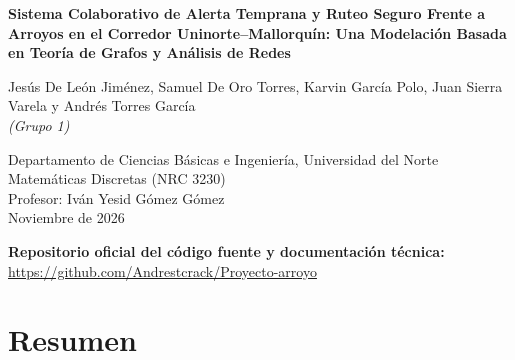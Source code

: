 \documentclass[12pt,letterpaper]{article}
\begin{document}
\begin{titlepage}
    \thispagestyle{plain}
    \begin{center}
        \vspace*{1.5cm}
        {\large \textbf{Sistema Colaborativo de Alerta Temprana y Ruteo Seguro Frente a Arroyos en el Corredor Uninorte--Mallorquín: Una Modelación Basada en Teoría de Grafos y Análisis de Redes}}

        \vspace{2.0cm}
        Jesús De León Jiménez, Samuel De Oro Torres, Karvin García Polo, Juan Sierra Varela y Andrés Torres García \\
        \textit{(Grupo 1)}

        \vspace{1.2cm}
        Departamento de Ciencias Básicas e Ingeniería, Universidad del Norte \\
        Matemáticas Discretas (NRC 3230) \\
        Profesor: Iván Yesid Gómez Gómez \\
        Noviembre de 2026

        \vspace{2.5cm}
        \begin{singlespacing}
        \textbf{Repositorio oficial del código fuente y documentación técnica:} \\
        \url{https://github.com/Andrestcrack/Proyecto-arroyo}
        \end{singlespacing}
    \end{center}
\end{titlepage}

\setcounter{page}{2}

\section{Resumen}
\end{document}
